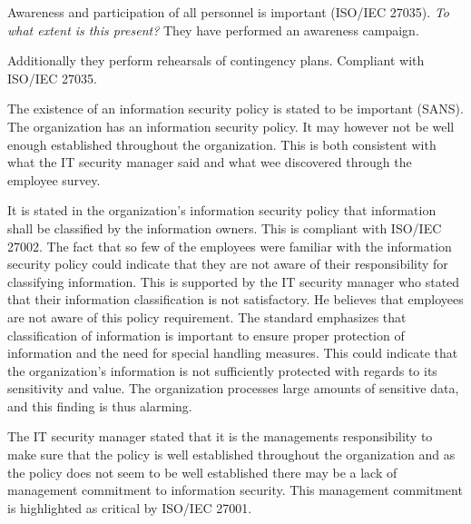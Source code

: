 Awareness and participation of all personnel is important (ISO/IEC 27035). \textit{To what extent is this present?} They have performed an awareness campaign. 

Additionally they perform rehearsals of contingency plans. Compliant with ISO/IEC 27035.

The existence of an information security policy is stated to be important (SANS). The organization has an information security policy. It may however not be well enough established throughout the organization. This is both consistent with what the IT security manager said and what wee discovered through the employee survey.

It is stated in the organization's information security policy that information shall be classified by the information owners. This is compliant with ISO/IEC 27002. The fact that so few of the employees were familiar with the information security policy could indicate that they are not aware of their responsibility for classifying information. This is supported by the IT security manager who stated that their information classification is not satisfactory. He believes that employees are not aware of this policy requirement. The standard emphasizes that classification of information is important to ensure proper protection of information and the need for special handling measures. This could indicate that the organization's information is not sufficiently protected with regards to its sensitivity and value. The organization processes large amounts of sensitive data, and this finding is thus alarming.

The IT security manager stated that it is the managements responsibility to make sure that the policy is well established throughout the organization and as the policy does not seem to be well established there may be a lack of management commitment to information security. This management commitment is highlighted as critical by ISO/IEC 27001. 



